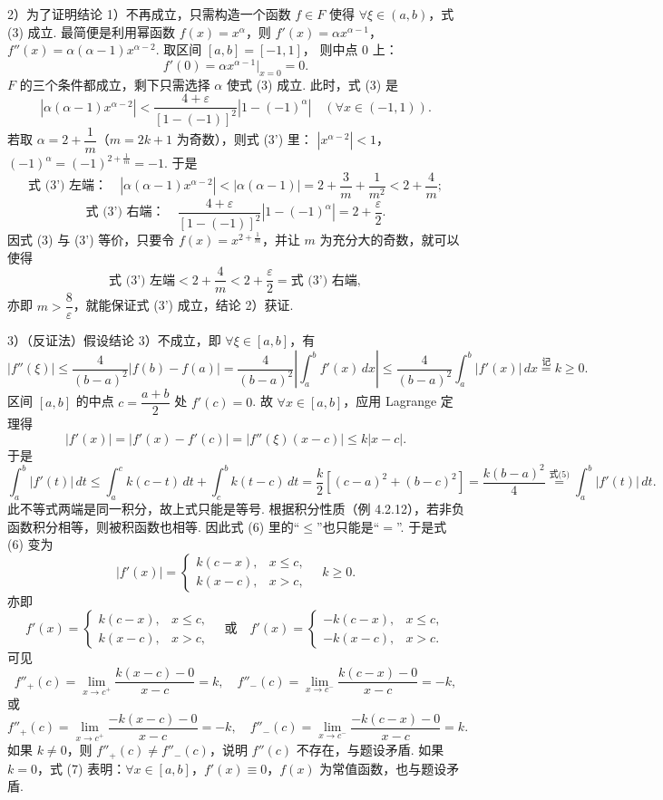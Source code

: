 \documentclass[UTF8,12pt,a4paper,fontset=fandol]{ctexart}
\begin{document}
2）为了证明结论 1）不再成立，只需构造一个函数 $f\in F$ 使得 $\forall \xi\in(a,b)$，式 (3) 成立.
最简便是利用幂函数 $f(x)=x^\alpha$，则 $f'(x)=\alpha x^{\alpha-1}$，
$f''(x)=\alpha(\alpha-1)x^{\alpha-2}$. 取区间 $[a,b]=[-1,1]$，
则中点 $0$ 上：
\[
f'(0)=\alpha x^{\alpha-1}\big|_{x=0}=0.
\]
$F$ 的三个条件都成立，剩下只需选择 $\alpha$ 使式 (3) 成立. 此时，式 (3) 是
\[
|\alpha(\alpha-1)x^{\alpha-2}|
<\frac{4+\varepsilon}{[1-(-1)]^2}|1-(-1)^\alpha|
\quad(\forall x\in(-1,1)). \tag{3'}
\]
若取 $\alpha=2+\dfrac1m$（$m=2k+1$ 为奇数），则式 (3') 里：
$|x^{\alpha-2}|<1$，$(-1)^\alpha=(-1)^{2+\frac1m}=-1$. 于是
\[
\text{式 (3') 左端：}\quad
|\alpha(\alpha-1)x^{\alpha-2}|<|\alpha(\alpha-1)|
=2+\frac3m+\frac1{m^2}<2+\frac4m;
\]
\[
\text{式 (3') 右端：}\quad
\frac{4+\varepsilon}{[1-(-1)]^2}|1-(-1)^\alpha|
=2+\frac\varepsilon2.
\]
因式 (3) 与 (3') 等价，只要令 $f(x)=x^{2+\frac1m}$，并让 $m$ 为充分大的奇数，就可以使得
\[
\text{式 (3') 左端}<2+\frac4m<2+\frac\varepsilon2=\text{式 (3') 右端},
\]
亦即 $m>\dfrac8\varepsilon$，就能保证式 (3') 成立，结论 2）获证.

3）（反证法）假设结论 3）不成立，即 $\forall \xi\in[a,b]$，有
\[
|f''(\xi)|\le \frac4{(b-a)^2}|f(b)-f(a)|
=\frac4{(b-a)^2}\left|\int_a^b f'(x)\,dx\right|
\le \frac4{(b-a)^2}\int_a^b |f'(x)|\,dx
\stackrel{\text{记}}{=} k\ge0. \tag{5}
\]
区间 $[a,b]$ 的中点 $c=\dfrac{a+b}{2}$ 处 $f'(c)=0$. 故 $\forall x\in[a,b]$，应用 Lagrange 定理得
\[
|f'(x)|=|f'(x)-f'(c)|=|f''(\xi)(x-c)|\le k|x-c|. \tag{6}
\]
于是
\[
\int_a^b |f'(t)|\,dt
\le \int_a^c k(c-t)\,dt+\int_c^b k(t-c)\,dt
=\frac k2[(c-a)^2+(b-c)^2]
=\frac{k(b-a)^2}{4}
\stackrel{\text{式(5)}}{=}\int_a^b |f'(t)|\,dt.
\]
此不等式两端是同一积分，故上式只能是等号. 根据积分性质（例 4.2.12），若非负函数积分相等，则被积函数也相等.
因此式 (6) 里的“$\le$”也只能是“$=$”. 于是式 (6) 变为
\[
|f'(x)|=
\begin{cases}
k(c-x),&x\le c,\\
k(x-c),&x>c,
\end{cases}
\quad k\ge0. \tag{7}
\]
亦即
\[
f'(x)=
\begin{cases}
k(c-x),&x\le c,\\
k(x-c),&x>c,
\end{cases}
\quad\text{或}\quad
f'(x)=
\begin{cases}
-k(c-x),&x\le c,\\
-k(x-c),&x>c.
\end{cases}
\]
可见
\[
f''_+(c)=\lim_{x\to c^+}\frac{k(x-c)-0}{x-c}=k,\quad
f''_-(c)=\lim_{x\to c^-}\frac{k(c-x)-0}{x-c}=-k,
\]
或
\[
f''_+(c)=\lim_{x\to c^+}\frac{-k(x-c)-0}{x-c}=-k,\quad
f''_-(c)=\lim_{x\to c^-}\frac{-k(c-x)-0}{x-c}=k.
\]
如果 $k\ne0$，则 $f''_+(c)\ne f''_-(c)$，说明 $f''(c)$ 不存在，与题设矛盾.
如果 $k=0$，式 (7) 表明：$\forall x\in[a,b]$，$f'(x)\equiv0$，$f(x)$ 为常值函数，也与题设矛盾.
\end{document}
